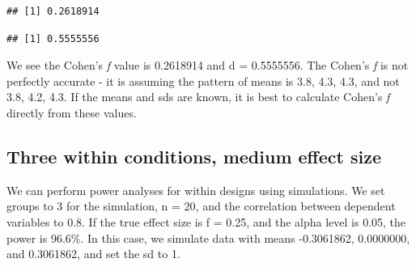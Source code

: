 \documentclass[
]{book}
\newenvironment{Shaded}{\begin{snugshade}}{\end{snugshade}}
\newcommand{\AttributeTok}[1]{\textcolor[rgb]{0.77,0.63,0.00}{#1}}
\newcommand{\DecValTok}[1]{\textcolor[rgb]{0.00,0.00,0.81}{#1}}
\newcommand{\FunctionTok}[1]{\textcolor[rgb]{0.00,0.00,0.00}{#1}}
\newcommand{\NormalTok}[1]{#1}
\newcommand{\OtherTok}[1]{\textcolor[rgb]{0.56,0.35,0.01}{#1}}
\newcommand{\SpecialCharTok}[1]{\textcolor[rgb]{0.00,0.00,0.00}{#1}}
\newcommand{\StringTok}[1]{\textcolor[rgb]{0.31,0.60,0.02}{#1}}
\begin{document}
\begin{Shaded}
\end{Shaded}

\begin{verbatim}
## [1] 0.2618914
\end{verbatim}

\begin{Shaded}
\end{Shaded}

\begin{verbatim}
## [1] 0.5555556
\end{verbatim}

We see the Cohen's \emph{f} value is 0.2618914 and d = 0.5555556. The Cohen's \emph{f} is not perfectly accurate - it is assuming the pattern of means is 3.8, 4.3, 4.3, and not 3.8, 4.2, 4.3. If the means and sds are known, it is best to calculate Cohen's \emph{f} directly from these values.

\hypertarget{three-within-conditions-medium-effect-size}{%
\subsection{Three within conditions, medium effect size}\label{three-within-conditions-medium-effect-size}}

We can perform power analyses for within designs using simulations. We set groups to 3 for the simulation, n = 20, and the correlation between dependent variables to 0.8. If the true effect size is f = 0.25, and the alpha level is 0.05, the power is 96.6\%. In this case, we simulate data with means -0.3061862, 0.0000000, and 0.3061862, and set the sd to 1.
\end{document}
